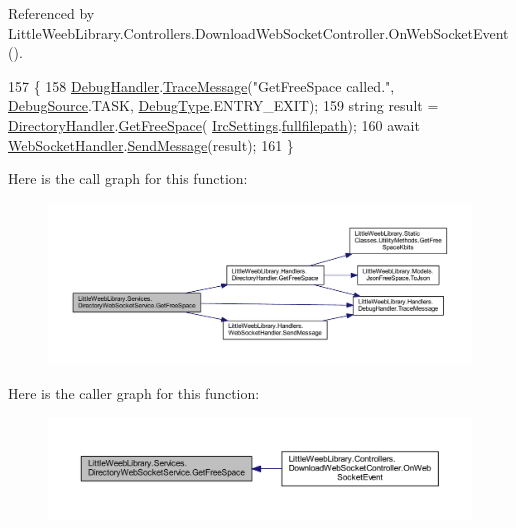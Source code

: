 Referenced by Little\+Weeb\+Library.\+Controllers.\+Download\+Web\+Socket\+Controller.\+On\+Web\+Socket\+Event().


\begin{DoxyCode}
157         \{
158             \mbox{\hyperlink{class_little_weeb_library_1_1_handlers_1_1_debug_handler}{DebugHandler}}.\mbox{\hyperlink{class_little_weeb_library_1_1_handlers_1_1_debug_handler_afccb37dfd6b2114af72000c2f4fe4607}{TraceMessage}}(\textcolor{stringliteral}{"GetFreeSpace called."}, 
      \mbox{\hyperlink{namespace_little_weeb_library_1_1_handlers_a2a6ca0775121c9c503d58aa254d292be}{DebugSource}}.TASK, \mbox{\hyperlink{namespace_little_weeb_library_1_1_handlers_ab66019ed40462876ec4e61bb3ccb0a62}{DebugType}}.ENTRY\_EXIT);
159             \textcolor{keywordtype}{string} result = \mbox{\hyperlink{class_little_weeb_library_1_1_handlers_1_1_directory_handler}{DirectoryHandler}}.\mbox{\hyperlink{class_little_weeb_library_1_1_handlers_1_1_directory_handler_aa439a303572de6bf09438d38a7fa4698}{GetFreeSpace}}(
      \mbox{\hyperlink{class_little_weeb_library_1_1_settings_1_1_irc_settings}{IrcSettings}}.\mbox{\hyperlink{class_little_weeb_library_1_1_settings_1_1_irc_settings_ad1f67b09e16ba2b5fed2dcdefeac8e1a}{fullfilepath}});
160             await \mbox{\hyperlink{class_little_weeb_library_1_1_handlers_1_1_web_socket_handler}{WebSocketHandler}}.\mbox{\hyperlink{class_little_weeb_library_1_1_handlers_1_1_web_socket_handler_a1de289d54d665a32c93478c68d3e6ad0}{SendMessage}}(result);
161         \}
\end{DoxyCode}
Here is the call graph for this function\+:\nopagebreak
\begin{figure}[H]
\begin{center}
\leavevmode
\includegraphics[width=350pt]{class_little_weeb_library_1_1_services_1_1_directory_web_socket_service_a37c3c5de12db8083e8e6d22ce1fe6776_cgraph}
\end{center}
\end{figure}
Here is the caller graph for this function\+:\nopagebreak
\begin{figure}[H]
\begin{center}
\leavevmode
\includegraphics[width=350pt]{class_little_weeb_library_1_1_services_1_1_directory_web_socket_service_a37c3c5de12db8083e8e6d22ce1fe6776_icgraph}
\end{center}
\end{figure}
